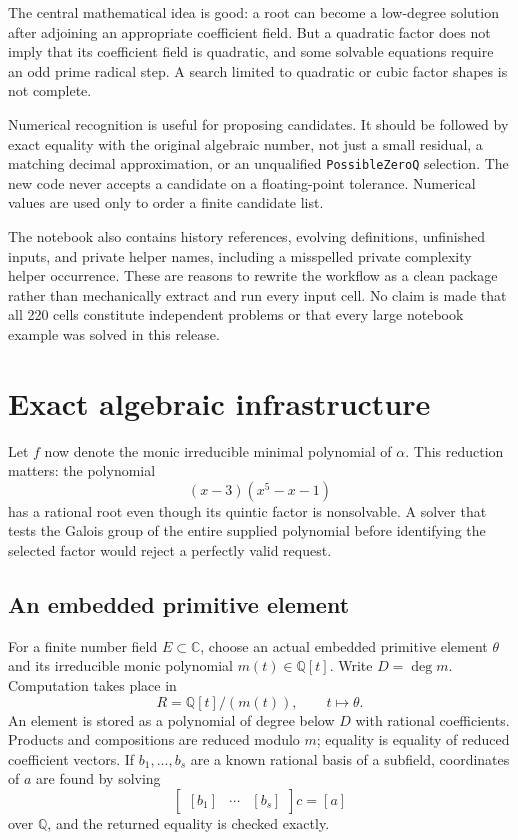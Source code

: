 \documentclass[11pt,letterpaper]{article}
\theoremstyle{definition}\newtheorem{definition}[theorem]{Definition}
\theoremstyle{remark}\newtheorem{remark}[theorem]{Remark}
\newcommand{\Q}{\mathbb Q}
\newcommand{\C}{\mathbb C}
\newcommand{\code}[1]{\texttt{#1}}
\begin{document}
The central mathematical idea is good: a root can become a low-degree
solution after adjoining an appropriate coefficient field. But a quadratic
factor does not imply that its coefficient field is quadratic, and some
solvable equations require an odd prime radical step. A search limited to
quadratic or cubic factor shapes is not complete.

Numerical recognition is useful for proposing candidates. It should be
followed by exact equality with the original algebraic number, not just a
small residual, a matching decimal approximation, or an unqualified
\code{PossibleZeroQ} selection. The new code never accepts a candidate on a
floating-point tolerance. Numerical values are used only to order a finite
candidate list.

The notebook also contains history references, evolving definitions,
unfinished inputs, and private helper names, including a misspelled private
complexity helper occurrence. These are reasons to rewrite the workflow as
a clean package rather than mechanically extract and run every input cell.
No claim is made that all 220 cells constitute independent problems or that
every large notebook example was solved in this release.

\section{Exact algebraic infrastructure}
\label{sec:infrastructure}
Let $f$ now denote the monic irreducible minimal polynomial of $\alpha$.
This reduction matters: the polynomial
\[
 (x-3)(x^5-x-1)
\]
has a rational root even though its quintic factor is nonsolvable. A solver
that tests the Galois group of the entire supplied polynomial before
identifying the selected factor would reject a perfectly valid request.

\subsection{An embedded primitive element}
For a finite number field $E\subset\C$, choose an actual embedded primitive
element $\theta$ and its irreducible monic polynomial $m(t)\in\Q[t]$.
Write $D=\deg m$. Computation takes place in
\begin{equation}\label{eq:ring}
 R=\Q[t]/(m(t)),\qquad t\longmapsto\theta.
\end{equation}
An element is stored as a polynomial of degree below $D$ with rational
coefficients. Products and compositions are reduced modulo $m$; equality
is equality of reduced coefficient vectors. If $b_1,\ldots,b_s$ are a
known rational basis of a subfield, coordinates of $a$ are found by solving
\begin{equation}\label{eq:linear}
 \begin{bmatrix}[b_1]&\cdots&[b_s]\end{bmatrix}c=[a]
\end{equation}
over $\Q$, and the returned equality is checked exactly.
\end{document}
